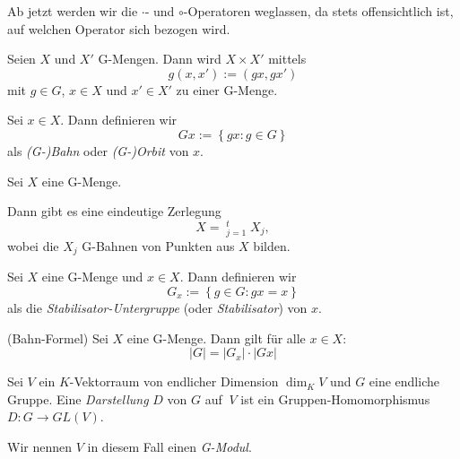 \documentclass[10p,a4paper,BCOR = 12mm, DIV=15]{scrbook}
\begin{document}
\begin{Bem}
Ab jetzt werden wir die $\cdot$- und $\circ$-Operatoren weglassen, da stets offensichtlich ist, auf welchen Operator sich bezogen wird.
\end{Bem}

\begin{Bem}
\label{bem:produkt_G-Mengen}
Seien $X$ und $X'$ G-Mengen. Dann wird $X \times X'$ mittels
\begin{displaymath}
g \left(x, x'\right) := \left(g x, g x'\right)
\end{displaymath}
mit $g \in G$, $x \in X$ und $x' \in X'$ zu einer G-Menge.
\end{Bem}

\begin{Def}
Sei $x \in X$. Dann definieren wir
\begin{displaymath}
G x := \left\{g x: g \in G\right\}
\end{displaymath}
als \emph{(G-)Bahn} oder \emph{(G-)Orbit} von $x$.
\end{Def}

\begin{Bem}
\label{bem:gbahnen}
Sei $X$ eine G-Menge.

Dann gibt es eine eindeutige Zerlegung
\begin{displaymath}
X = \mathop{\dot{\bigcup}}_{j=1}^t X_j,
\end{displaymath}
wobei die $X_j$ G-Bahnen von Punkten aus $X$ bilden.
\end{Bem}

\begin{Def}
Sei $X$ eine G-Menge und $x \in X$. Dann definieren wir
\begin{displaymath}
G_x := \left\{g \in G: g x = x\right\}
\end{displaymath}
als die \emph{Stabilisator-Untergruppe} (oder \emph{Stabilisator}) von $x$.
\end{Def}

\begin{Le} (Bahn-Formel)
\label{le:bahnformel}
Sei $X$ eine G-Menge. Dann gilt für alle $x\in X$:
\begin{displaymath}
\left|G\right| = \left|G_x\right| \cdot \left|G x\right|
\end{displaymath}
\end{Le}

\begin{Def}
\label{def:darstellung}
Sei $V$ ein $K$-Vektorraum von endlicher Dimension $\dim_K V$ und $G$ eine endliche Gruppe. Eine \emph{Darstellung} $D$ von $G$ auf $\ V$ ist ein Gruppen-Homo\-mor\-phismus $D: G \rightarrow GL\left(V\right)$.

Wir nennen $V$ in diesem Fall einen \emph{G-Modul}.
\end{Def}
\end{document}
